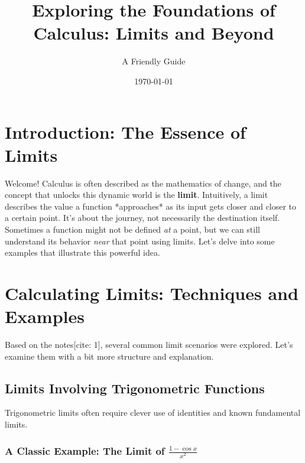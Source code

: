 \documentclass[12pt]{article}
\title{Exploring the Foundations of Calculus: Limits and Beyond}
\author{A Friendly Guide}
\date{\today}
\begin{document}
\maketitle

\section{Introduction: The Essence of Limits}

Welcome! Calculus is often described as the mathematics of change, and the concept that unlocks this dynamic world is the \textbf{limit}. Intuitively, a limit describes the value a function *approaches* as its input gets closer and closer to a certain point. It's about the journey, not necessarily the destination itself. Sometimes a function might not be defined \emph{at} a point, but we can still understand its behavior \emph{near} that point using limits. Let's delve into some examples that illustrate this powerful idea.

\section{Calculating Limits: Techniques and Examples}

Based on the notes[cite: 1], several common limit scenarios were explored. Let's examine them with a bit more structure and explanation.

\subsection{Limits Involving Trigonometric Functions}

Trigonometric limits often require clever use of identities and known fundamental limits.

\subsubsection{A Classic Example: The Limit of \texorpdfstring{$\frac{1 - \cos x}{x^2}$}{ (1-cos x)/x\textasciicircum 2}}
\end{document}
